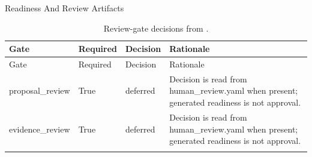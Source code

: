 \documentclass[
  ignorenonframetext,
]{beamer}
\begin{document}
\begin{frame}{Readiness And Review Artifacts}
\begin{longtable}[]{@{}
  >{\raggedright\arraybackslash}p{}
  >{\raggedright\arraybackslash}p{}
  >{\raggedright\arraybackslash}p{}
  >{\raggedright\arraybackslash}p{}@{}}
\caption{Review-gate decisions from
\protect{}.}\label{tbl:review-gates}\tabularnewline
\toprule\noalign{}
\begin{minipage}[b]{\linewidth}\raggedright
Gate
\end{minipage} & \begin{minipage}[b]{\linewidth}\raggedright
Required
\end{minipage} & \begin{minipage}[b]{\linewidth}\raggedright
Decision
\end{minipage} & \begin{minipage}[b]{\linewidth}\raggedright
Rationale
\end{minipage} \\
\midrule\noalign{}
\endfirsthead
\toprule\noalign{}
\begin{minipage}[b]{\linewidth}\raggedright
Gate
\end{minipage} & \begin{minipage}[b]{\linewidth}\raggedright
Required
\end{minipage} & \begin{minipage}[b]{\linewidth}\raggedright
Decision
\end{minipage} & \begin{minipage}[b]{\linewidth}\raggedright
Rationale
\end{minipage} \\
\midrule\noalign{}
\endhead
proposal\_review & True & deferred & Decision is read from
human\_review.yaml when present; generated readiness is not approval. \\
evidence\_review & True & deferred & Decision is read from
human\_review.yaml when present; generated readiness is not approval. \\
\bottomrule\noalign{}
\end{longtable}


\end{frame}
\end{document}
